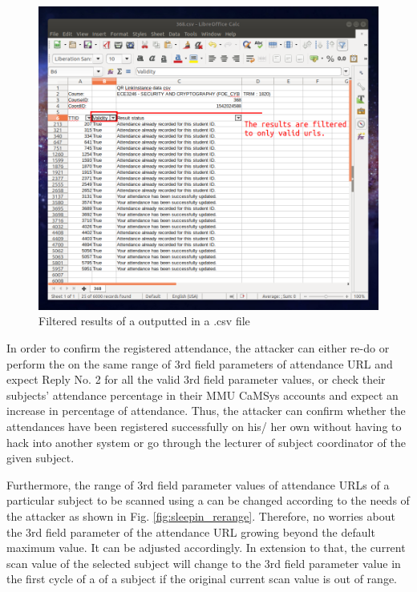 \documentclass[runningheads]{llncs}
\begin{document}
\begin{figure}
\includegraphics[width=\textwidth]{imgres/sleepin_csv_output.png}
\caption{Filtered results of a \scanattack{} outputted in a .csv file} 
\label{fig:sleepin_csv_result}
\end{figure}

In order to confirm the registered attendance, the attacker can either re-do or perform the \scanattack{} on the same range of 3rd field parameters of attendance URL and expect Reply No. 2 for all the valid 3rd field parameter values, or check their subjects' attendance percentage in their MMU CaMSys accounts and expect an increase in percentage of attendance. Thus, the attacker can confirm whether the attendances have been registered successfully on his/ her own without having to hack into another system or go through the lecturer of subject coordinator of the given subject. 

Furthermore, the range of 3rd field parameter values of attendance URLs of a particular subject to be scanned using a \scanattack{} can be changed according to the needs of the attacker as shown in Fig. \ref{fig:sleepin_rerange}. Therefore, no worries about the 3rd field parameter of the attendance URL growing beyond the default maximum value. It can be adjusted accordingly. In extension to that, the current scan value of the selected subject will change to the 3rd field parameter value in the first cycle of a \scanattack{} of a subject if the original current scan value is out of range. 
\end{document}
